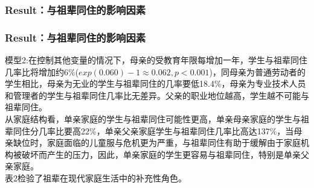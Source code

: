 \documentclass{beamer}
\begin{document}
\begin{frame}
\frametitle{Result：与祖辈同住的影响因素}
\end{frame}



\begin{frame}
\frametitle{Result：与祖辈同住的影响因素}
	模型2:在控制其他变量的情况下，母亲的受教育年限每增加一年，学生与祖辈同住几率比将增加约6\%($exp(0.060)-1 \approx 0.062,p<0.001$)，同母亲为普通劳动者的学生相比，母亲为无业的学生与祖辈同住的几率要低18.4\%，母亲为专业技术人员和管理者的学生与祖辈同住几率比无差异。父亲的职业地位越高，学生越不可能与祖辈同住。
\\ 从家庭结构看，单亲家庭的学生与祖辈同住可能性更高，单亲母亲家庭的学生与祖辈同住分几率比要高22\%，单亲父亲家庭学生与祖辈同住几率比高达137\%，当母亲缺位时，家庭面临的儿童服与危机更为严重，与祖辈同住有助于缓解由于家庭机构被破坏而产生的压力，因此，单亲家庭的学生更容易与祖辈同住，特别是单亲父亲家庭。
\\ 表2检验了祖辈在现代家庭生活中的补充性角色。
\end{frame}
\end{document}
